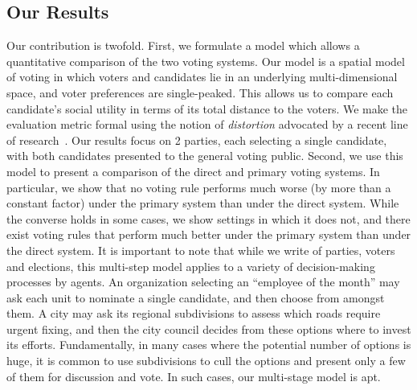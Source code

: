 \documentclass[letterpaper]{article} %
\newcommand{\kibitz}[2]{\ifnum\Comments=1{\color{#1}{#2}}\fi}
\newcommand{\ns}[1]{\kibitz{blue}{[Nisarg: #1]}}
\theoremstyle{definition}
\begin{document}
\subsection{Our Results}
Our contribution is twofold. First, we formulate a model which allows a quantitative comparison of the two voting systems. Our model is a spatial model of voting in which voters and candidates lie in an underlying multi-dimensional space, and voter preferences are single-peaked. This allows us to compare each candidate's social utility in terms of its total distance to the voters. We make the evaluation metric formal using the notion of \emph{distortion} advocated by a recent line of research~\cite{PR06,BCHL+15}. Our results focus on 2 parties, each selecting a single candidate, with both candidates presented to the general voting public.
Second, we use this model to present a comparison of the direct and primary voting systems. In particular, we show that no voting rule performs much worse (by more than a constant factor) under the primary system than under the direct system. While the converse holds in some cases, we show settings in which it does not, and there exist voting rules that perform much better under the primary system than under the direct system.%
It is important to note that while we write of parties, voters and elections, this multi-step model applies to a variety of decision-making processes by agents. An organization selecting an ``employee of the month'' may ask each unit to nominate a single candidate, and then choose from amongst them. A city may ask its regional subdivisions to assess which roads require urgent fixing, and then the city council decides from these options where to invest its efforts. Fundamentally, in many cases where the potential number of options is huge, it is common to use subdivisions to cull the options and present only a few of them for discussion and vote. In such cases, our multi-stage model is apt. %
\end{document}
